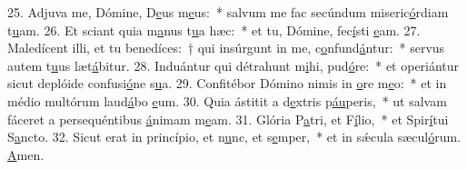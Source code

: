 25. Adjuva me, Dómine, D\uline{e}us m\uline{e}us:~* salvum me fac secúndum miseric\uline{ó}rdiam t\uline{u}am.
26. Et sciant quia m\uline{a}nus t\uline{u}a hæc:~* et tu, Dómine, fec\uline{í}sti \uline{e}am.
27. Maledícent illi, et tu benedíces:~† qui insúrgunt in me, c\uline{o}nfund\uline{á}ntur:~* servus autem t\uline{u}us læt\uline{á}bitur.
28. Induántur qui détrahunt m\uline{i}hi, pud\uline{ó}re:~* et operiántur sicut deplóide confusi\uline{ó}ne s\uline{u}a.
29. Confitébor Dómino nimis in \uline{o}re m\uline{e}o:~* et in médio multórum laud\uline{á}bo \uline{e}um.
30. Quia ástitit a d\uline{e}xtris p\uline{áu}peris,~* ut salvam fáceret a persequéntibus \uline{á}nimam m\uline{e}am.
31. Glória P\uline{a}tri, et F\uline{í}lio,~* et Spir\uline{í}tui S\uline{a}ncto.
32. Sicut erat in princípio, et n\uline{u}nc, et s\uline{e}mper,~* et in sǽcula sæcul\uline{ó}rum. \uline{A}men.
